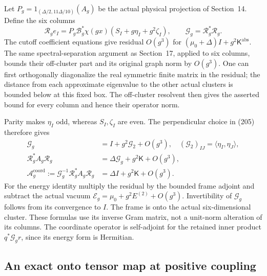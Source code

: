 \documentclass[11pt]{article}
\begin{document}
Let $P_g=1_{(\Delta/2,11\Delta/10)}(A_g)$ be the actual physical
projection of Section~14. Define the six columns
\begin{equation}\label{eq:band-raw-frame}
 \mathcal R_g e_I=P_g\mathcal B_g^*\chi(gx)
                         (S_I+g\eta_I+g^2\zeta_I),\qquad
 \mathcal G_g=\mathcal R_g^*\mathcal R_g.
\end{equation}
The cutoff coefficient equations give residual $O(g^3)$ for
$(\mu_0+\Delta)I+g^2\mathsf K^{\mathrm{abs}}$.
The same spectral-separation argument as Section~17, applied to
six columns, bounds their off-cluster part and its original graph
norm by $O(g^3)$. One can first orthogonally diagonalize the real
symmetric finite matrix in the residual; the distance from each
approximate eigenvalue to the other actual clusters is bounded
below at this fixed box. The off-cluster resolvent then gives
the asserted bound for every column and hence their operator norm.

Parity makes $\eta_I$ odd, whereas $S_I,\zeta_I$ are even.
The perpendicular choice in (205) therefore gives
\begin{align}
 \mathcal G_g&=I+g^2\mathcal G_2+O(g^3),\quad
             (\mathcal G_2)_{IJ}=\langle\eta_I,\eta_J\rangle,\nonumber\\
 \mathcal R_g^*A_g\mathcal R_g
       &=\Delta\mathcal G_g+g^2\mathsf K+O(g^3),\nonumber\\
 \mathcal A_g^{\mathrm{coord}}
       :=\mathcal G_g^{-1}\mathcal R_g^*A_g\mathcal R_g
       &=\Delta I+g^2\mathsf K+O(g^3).
 \label{eq:band-raw-Gram-energy}
\end{align}
For the energy identity multiply the residual by the bounded frame
adjoint and subtract the actual vacuum
$\mathcal E_g=\mu_0+g^2E^{(2)}+O(g^3)$.
Invertibility of $\mathcal G_g$ follows from its convergence to $I$.
The frame is onto the actual six-dimensional cluster. These formulas
use its inverse Gram matrix, not a unit-norm alteration of its
columns. The coordinate operator is self-adjoint for the retained
inner product $q^*\mathcal G_g r$, since its energy form is Hermitian.

\subsection{An exact onto tensor map at positive coupling}
\end{document}
